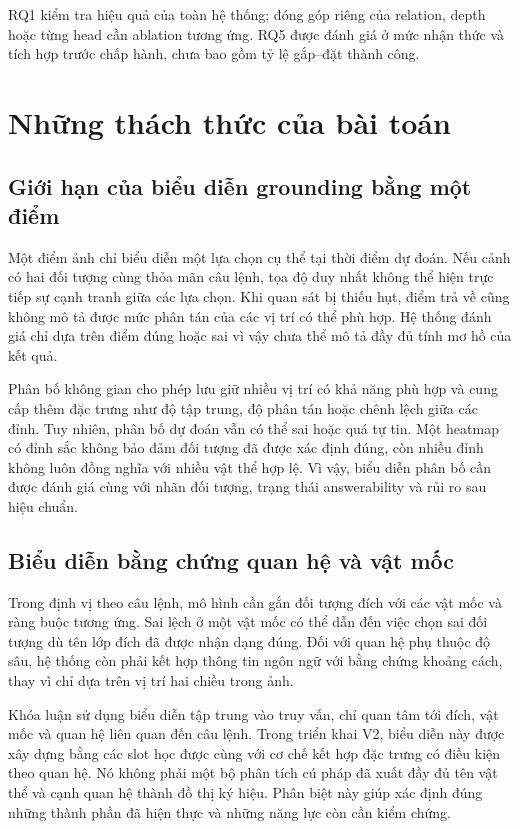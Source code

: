 RQ1 kiểm tra hiệu quả của toàn hệ thống; đóng góp riêng của relation, depth hoặc từng head cần ablation tương ứng. RQ5 được đánh giá ở mức nhận thức và tích hợp trước chấp hành, chưa bao gồm tỷ lệ gắp--đặt thành công.

\section{Những thách thức của bài toán}
\label{sec:introduction-challenges}

\subsection{Giới hạn của biểu diễn grounding bằng một điểm}

Một điểm ảnh chỉ biểu diễn một lựa chọn cụ thể tại thời điểm dự đoán. Nếu cảnh có hai đối tượng cùng thỏa mãn câu lệnh, tọa độ duy nhất không thể hiện trực tiếp sự cạnh tranh giữa các lựa chọn. Khi quan sát bị thiếu hụt, điểm trả về cũng không mô tả được mức phân tán của các vị trí có thể phù hợp. Hệ thống đánh giá chỉ dựa trên điểm đúng hoặc sai vì vậy chưa thể mô tả đầy đủ tính mơ hồ của kết quả.

Phân bố không gian cho phép lưu giữ nhiều vị trí có khả năng phù hợp và cung cấp thêm đặc trưng như độ tập trung, độ phân tán hoặc chênh lệch giữa các đỉnh. Tuy nhiên, phân bố dự đoán vẫn có thể sai hoặc quá tự tin. Một heatmap có đỉnh sắc không bảo đảm đối tượng đã được xác định đúng, còn nhiều đỉnh không luôn đồng nghĩa với nhiều vật thể hợp lệ. Vì vậy, biểu diễn phân bố cần được đánh giá cùng với nhãn đối tượng, trạng thái answerability và rủi ro sau hiệu chuẩn.

\subsection{Biểu diễn bằng chứng quan hệ và vật mốc}

Trong định vị theo câu lệnh, mô hình cần gắn đối tượng đích với các vật mốc và ràng buộc tương ứng. Sai lệch ở một vật mốc có thể dẫn đến việc chọn sai đối tượng dù tên lớp đích đã được nhận dạng đúng. Đối với quan hệ phụ thuộc độ sâu, hệ thống còn phải kết hợp thông tin ngôn ngữ với bằng chứng khoảng cách, thay vì chỉ dựa trên vị trí hai chiều trong ảnh.

Khóa luận sử dụng biểu diễn tập trung vào truy vấn, chỉ quan tâm tới đích, vật mốc và quan hệ liên quan đến câu lệnh. Trong triển khai V2, biểu diễn này được xây dựng bằng các slot học được cùng với cơ chế kết hợp đặc trưng có điều kiện theo quan hệ. Nó không phải một bộ phân tích cú pháp đã xuất đầy đủ tên vật thể và cạnh quan hệ thành đồ thị ký hiệu. Phân biệt này giúp xác định đúng những thành phần đã hiện thực và những năng lực còn cần kiểm chứng.

